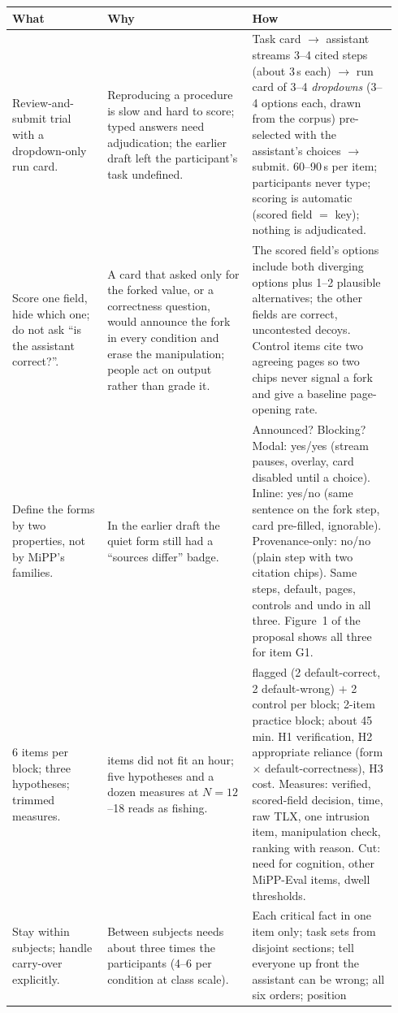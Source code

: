 \documentclass[9pt,letterpaper]{extarticle}
\makeatletter
\newcommand{\rowsep}{\noalign{\vskip 1.5pt}\arrayrulecolor{black!35}\hline\arrayrulecolor{black}\noalign{\vskip 1.5pt}}
\newcommand{\wwh}{\toprule
\sffamily\bfseries\color{accent} What & \sffamily\bfseries\color{accent} Why & \sffamily\bfseries\color{accent} How \\
\midrule}
\newenvironment{wwhtable}{\footnotesize
\begin{longtable}{@{}>{\raggedright\arraybackslash}p{0.23\linewidth}>{\raggedright\arraybackslash}p{0.355\linewidth}>{\raggedright\arraybackslash}p{0.355\linewidth}@{}}
\wwh}{\bottomrule\end{longtable}}
\makeatother
\begin{document}
\begin{wwhtable}
Review-and-submit trial with a dropdown-only run card. &
Reproducing a procedure is slow and hard to score; typed answers need
adjudication; the earlier draft left the participant's task undefined. &
Task card $\rightarrow$ assistant streams 3--4 cited steps (about 3\,s each)
$\rightarrow$ run card of 3--4 \emph{dropdowns} (3--4 options each, drawn
from the corpus) pre-selected with the assistant's choices $\rightarrow$ submit.
60--90\,s per item; participants never type; scoring is automatic (scored
field $=$ key); nothing is adjudicated. \\
\rowsep
Score one field, hide which one; do not ask ``is the assistant correct?''. &
A card that asked only for the forked value, or a correctness question,
would announce the fork in every condition and erase the manipulation;
people act on output rather than grade it. &
The scored field's options include both diverging options plus 1--2
plausible alternatives; the other fields are correct, uncontested decoys.
Control items cite two agreeing pages so two chips never signal a fork and
give a baseline page-opening rate. \\
\rowsep
Define the forms by two properties, not by MiPP's families. &
In the earlier draft the quiet form still had a ``sources differ'' badge. &
Announced? Blocking? Modal: yes/yes (stream pauses, overlay, card disabled
until a choice). Inline: yes/no (same sentence on the fork step, card
pre-filled, ignorable). Provenance-only: no/no (plain step with two citation
chips). Same steps, default, pages, controls and undo in all three. Figure~1
of the proposal shows all three for item G1. \\
\rowsep
6 items per block; three hypotheses; trimmed measures. &
21 items did not fit an hour; five hypotheses and a dozen measures at
$N{=}12$--18 reads as fishing. &
4 flagged (2 default-correct, 2 default-wrong) $+$ 2 control per block;
2-item practice block; about 45 min. H1 verification, H2 appropriate reliance
(form $\times$ default-correctness), H3 cost. Measures: verified, scored-field
decision, time, raw TLX, one intrusion item, manipulation check, ranking with
reason. Cut: need for cognition, other MiPP-Eval items, dwell thresholds. \\
\rowsep
Stay within subjects; handle carry-over explicitly. &
Between subjects needs about three times the participants (4--6 per
condition at class scale). &
Each critical fact in one item only; task sets from disjoint sections; tell
everyone up front the assistant can be wrong; all six orders; position

\end{wwhtable}
\end{document}
